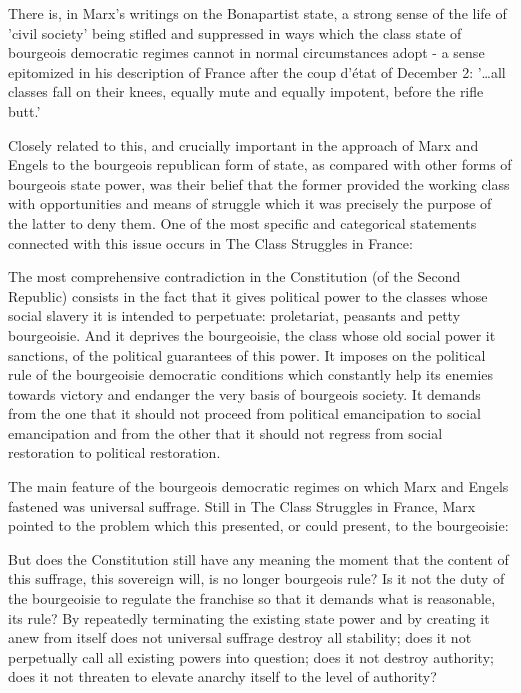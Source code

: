  There is, in Marx's writings on the Bonapartist state, a strong sense of the life of 'civil society' being stifled and suppressed in ways which the class state of bourgeois democratic regimes cannot in normal circumstances adopt - a sense epitomized in his description of France after the coup d'état of December 2: '\dots all classes fall on their knees, equally mute and equally impotent, before the rifle butt.'
 
 Closely related to this, and crucially important in the approach of Marx and Engels to the bourgeois republican form of state, as compared with other forms of bourgeois state power, was their belief that the former provided the working class with opportunities and means of struggle which it was precisely the purpose of the latter to deny them. One of the most specific and categorical statements connected with this issue occurs in The Class Struggles in France:
 \begin{displayquote}
    The most comprehensive contradiction in the Constitution (of the Second Republic) consists in the fact that it gives political power to the classes whose social slavery it is intended to perpetuate: proletariat, peasants and petty bourgeoisie. And it deprives the bourgeoisie, the class whose old social power it sanctions, of the political guarantees of this power. It imposes on the political rule of the bourgeoisie democratic conditions which constantly help its enemies towards victory and endanger the very basis of bourgeois society. It demands from the one that it should not proceed from political emancipation to social emancipation and from the other that it should not regress from social restoration to political restoration.
 \end{displayquote}
 
 The main feature of the bourgeois democratic regimes on which Marx and Engels fastened was universal suffrage. Still in The Class Struggles in France, Marx pointed to the problem which this presented, or could present, to the bourgeoisie:
 \begin{displayquote}
    But does the Constitution still have any meaning the moment that the content of this suffrage, this sovereign will, is no longer bourgeois rule? Is it not the duty of the bourgeoisie to regulate the franchise so that it demands what is reasonable, its rule? By repeatedly terminating the existing state power and by creating it anew from itself does not universal suffrage destroy all stability; does it not perpetually call all existing powers into question; does it not destroy authority; does it not threaten to elevate anarchy itself to the level of authority?
 \end{displayquote}
 
